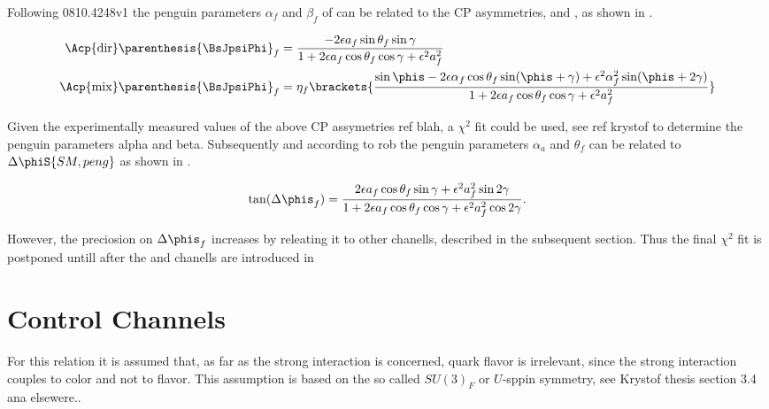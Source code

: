 Following {\color{red} 0810.4248v1} the penguin parameters $\alpha_f$ and $\beta_f$ of 
can be related to the CP asymmetries,  and ,
as shown in \equref{}.

\begin{align}
  \Acp{\rm dir}\parenthesis{\BsJpsiPhi}_f &= \frac{ -2\epsilon a_f \sin\theta_f \sin\gamma} {1 + 2\epsilon a_f \cos\theta_f \cos\gamma + \epsilon^2 a_f^{2}} \\
  \Acp{\rm mix}\parenthesis{\BsJpsiPhi}_f &= \eta_f \brackets{\frac{\sin\phis - 2\epsilon\alpha_f \cos\theta_f\sin(\phis+\gamma) + \epsilon^2\alpha_f^2 \sin(\phis+2\gamma)}
                                                                 {1 + 2\epsilon a_f \cos\theta_f \cos\gamma + \epsilon^2a_f^{2}} }
  \label{bsjpsiphi_peng_acp_obs}
\end{align}

Given the experimentally measured values of the above CP assymetries {\color{red} ref blah}, a $\chi^2$ fit could be used,
see ref {\color{red} krystof} to determine the penguin parameters alpha and beta. Subsequently and according to rob
the penguin parameters $\alpha_a$ and $\theta_f$ can be related to $\Delta\phiS{SM,peng}$ as shown in .

\begin{equation}
\tan(\Delta{\phis}_f) = \frac{2\epsilon a_f \cos\theta_f \sin\gamma+\epsilon^2 a^2_f \sin2\gamma}{1+2\epsilon a_f \cos\theta_f \cos\gamma+ \epsilon^2 a^2_f \cos2\gamma}.
\label{tandelta}
\end{equation}

However, the preciosion on $\Delta{\phis}_f$ increases by releating it to other chanells, described in the subsequent section.
Thus the final $\chi^2$ fit is postponed untill after the \BsJpsiKst and \BsJpsiRho chanells are introduced in 

\section{Control Channels}
\label{penguin_more_chanells}

For this relation it is assumed that, as far as the strong interaction is concerned, quark flavor is irrelevant,
since the strong interaction couples to color and not to flavor. This assumption is based on the so called $SU(3)_F$ or $U$-sppin symmetry,
see {\color{red} Krystof thesis section 3.4 ana elsewere.}.


